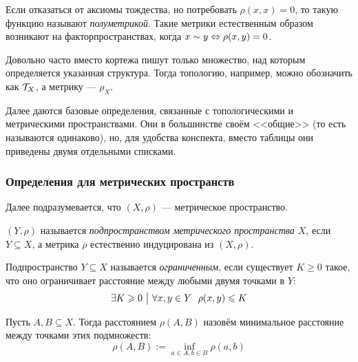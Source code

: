 \begin{note}
	Если отказаться от аксиомы тождества, но потребовать $\rho(x, x) = 0$, то такую функцию называют \textit{полуметрикой}. Такие метрики естественным образом возникают на факторпространствах, когда $x \sim y \Leftrightarrow \rho(x, y) = 0$.
\end{note}

\begin{note}
	Довольно часто вместо кортежа пишут только множество, над которым определяется указанная структура. Тогда топологию, например, можно обозначить как $\mathcal{T}_X$, а метрику --- $\rho_X$.
\end{note}

\begin{anote}
	Далее даются базовые определения, связанные с топологическими и метрическими пространствами. Они в большинстве своём <<общие>> (то есть называются одинаково), но, для удобства конспекта, вместо таблицы они приведены двумя отдельными списками.
\end{anote}

\subsubsection*{Определения для метрических пространств}

\begin{note}
	Далее подразумевается, что $(X, \rho)$ --- метрическое пространство.
\end{note}

\begin{definition}
	$(Y, \rho)$ называется \textit{подпространством метрического пространства $X$}, если $Y \subseteq X$, а метрика $\rho$ естественно индуцирована из $(X, \rho)$.
\end{definition}

\begin{definition}
	Подпространство $Y \subseteq X$ называется \textit{ограниченным}, если существует $K \ge 0$ такое, что оно ограничивает расстояние между любыми двумя точками в $Y$:
	\[
		\exists K \ge 0 \such \forall x, y \in Y\ \ \rho(x, y) \le K
	\]
\end{definition}

\begin{definition}
	Пусть $A, B \subseteq X$. Тогда расстоянием $\rho(A, B)$ назовём минимальное расстояние между точками этих подмножеств:
	\[
		\rho(A, B) := \inf_{a \in A, b \in B} \rho(a, b)
	\]
\end{definition}

